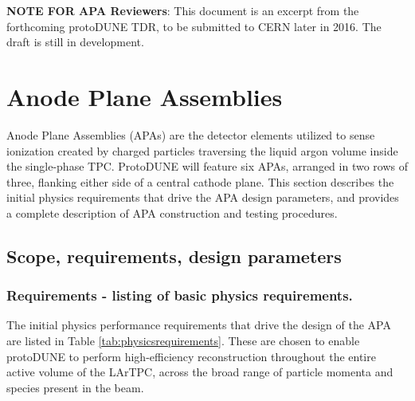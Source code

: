 
\textbf{NOTE FOR APA Reviewers}:  This document is an excerpt from the forthcoming protoDUNE TDR, to be submitted to CERN later in 2016.  The draft is still in development. 
\section{Anode Plane Assemblies}

Anode Plane Assemblies (APAs) are the detector elements utilized to sense ionization created by charged particles traversing the liquid argon volume inside the single-phase TPC.  ProtoDUNE will feature six APAs, arranged in two rows of three, flanking either side of a central cathode plane.  This section describes the initial physics requirements that drive the APA design parameters, and provides a complete description of APA construction and testing procedures.



\subsection{Scope, requirements, design parameters}

 

\subsubsection{Requirements - listing of basic physics requirements.}

The initial physics performance requirements that drive the design of the APA are listed in Table \ref{tab:physicsrequirements}.  These are chosen to enable protoDUNE to perform high-efficiency reconstruction throughout the entire active volume of the LArTPC, across the broad range of particle momenta and species present in the beam.  

